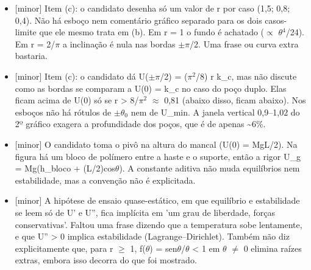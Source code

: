 \documentclass{article}%
\begin{document}
\begin{itemize}%
\item%
{[}minor{]} Item (c): o candidato desenha só um valor de r por caso (1,5; 0,8; 0,4). Não há esboço nem comentário gráfico separado para os dois casos{-}limite que ele mesmo trata em (b). Em r = 1 o fundo é achatado ($\propto$ $\theta$$^{4}$/24). Em r = 2/$\pi$ a inclinação é nula nas bordas $\pm$$\pi$/2. Uma frase ou curva extra bastaria.%
\item%
{[}minor{]} Item (c): o candidato dá U($\pm$$\pi$/2) = ($\pi$$^2$/8) r k\_c, mas não discute como as bordas se comparam a U(0) = k\_c no caso do poço duplo. Elas ficam acima de U(0) só se r > 8/$\pi$$^2$ $\approx$ 0,81 (abaixo disso, ficam abaixo). Nos esboços não há rótulos de $\pm$$\theta$$_{0}$ nem de U\_min. A janela vertical 0,9--1,02 do 2º gráfico exagera a profundidade dos poços, que é de apenas \textasciitilde{}6\%.%
\item%
{[}minor{]} O candidato toma o pivô na altura do mancal (U(0) = MgL/2). Na figura há um bloco de polímero entre a haste e o suporte, então a rigor U\_g = Mg(h\_bloco + (L/2)cos$\theta$). A constante aditiva não muda equilíbrios nem estabilidade, mas a convenção não é explicitada.%
\item%
{[}minor{]} A hipótese de ensaio quase{-}estático, em que equilíbrio e estabilidade se leem só de U' e U'', fica implícita em 'um grau de liberdade, forças conservativas'. Faltou uma frase dizendo que a temperatura sobe lentamente, e que U'' > 0 implica estabilidade (Lagrange--Dirichlet). Também não diz explicitamente que, para r $\geq$ 1, f($\theta$) = sen$\theta$/$\theta$ < 1 em $\theta$ $\neq$ 0 elimina raízes extras, embora isso decorra do que foi mostrado.%
\end{itemize}%
\end{document}
